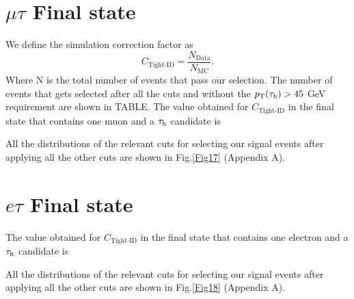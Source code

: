 \section{$\mu\tau$ Final state}
We define the simulation correction factor as
\begin{equation}
	C_{\text{Tight-ID}}=\frac{N_{\text{Data}}}{N_{\text{MC}}}.
\end{equation}
Where N is the total number of events that pass our selection. The number of events that gets selected after all the cuts and without the $p_\text{T}(\tau_\text{h})>45$ GeV requirement are shown in TABLE. The value obtained for $C_{\text{Tight-ID}}$ in the final state that contains one muon and a $\tau_\text{h}$ candidate is

All the distributions of the relevant cuts for selecting our signal events after applying all the other cuts are shown in Fig.\ref{Fig17} (Appendix A).
\section{$e\tau$ Final state}
The value obtained for $C_{\text{Tight-ID}}$ in the final state that contains one electron and a $\tau_\text{h}$ candidate is

All the distributions of the relevant cuts for selecting our signal events after applying all the other cuts are shown in Fig.\ref{Fig18} (Appendix A).
